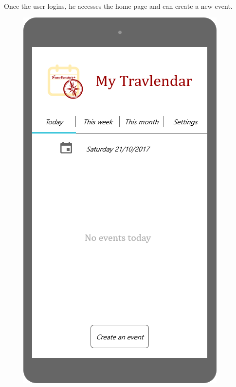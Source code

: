 \documentclass{article}
\begin{document}
		\paragraph{}Once the user logins, he accesses the home page and can create a new event.
			\begin{figure}[H]
			\includegraphics[width=\linewidth]{Images/Mockup/Mobile/03-Home_Page.png}

\end{figure}
\end{document}
